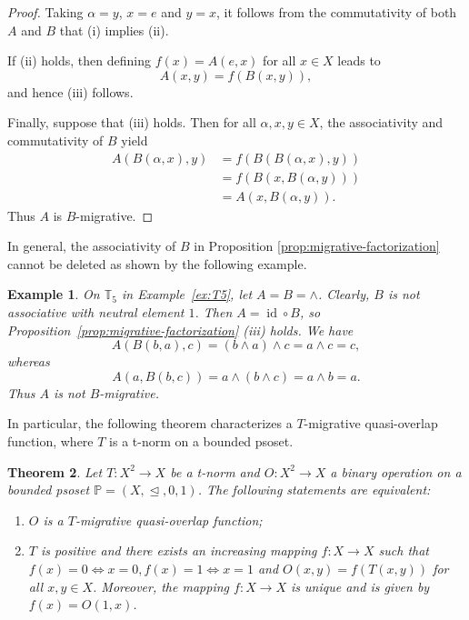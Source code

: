 \documentclass[preprint,12pt]{elsarticle}
\newtheorem{theorem}{Theorem}[section]
\newtheorem{example}[theorem]{Example}
\begin{document}
\begin{proof}
Taking $\alpha=y$, $x=e$ and $y=x$, it follows from the commutativity of both $A$ and $B$ that (i) implies (ii).

If (ii) holds, then defining $f(x)=A(e,x)$ for all $x\in X$ leads to
$$
 A(x,y)=f(B(x,y)),
$$
and hence (iii) follows.

Finally, suppose that (iii) holds. Then for all $\alpha,x,y\in X$, the associativity and commutativity of $B$ yield
$$
\begin{aligned}
A(B(\alpha,x),y)
&=f(B(B(\alpha,x),y))\\
&=f(B(x,B(\alpha,y)))\\
&=A(x,B(\alpha,y)).
\end{aligned}
$$
Thus $A$ is $B$-migrative.
\end{proof}

In general, the associativity of $B$ in Proposition \ref{prop:migrative-factorization} cannot be deleted as shown by the following example.
\begin{example}\label{ex:migrativity-assoc-essential}
\upshape
On $\mathbb{T}_5$ in Example~\ref{ex:T5}, let $A=B=\wedge$. Clearly, $B$ is not associative with  neutral element $1$. Then $A=\operatorname{id}\circ B$, so Proposition~\ref{prop:migrative-factorization} (iii) holds. We have
$$
 A(B(b,a),c)=(b\wedge a)\wedge c=a\wedge c=c,
$$
whereas
$$
 A(a,B(b,c))=a\wedge(b\wedge c)=a\wedge b=a.
$$
Thus $A$ is not $B$-migrative.
\end{example}

In particular, the following theorem characterizes a $T$-migrative quasi-overlap function, where $T$ is a t-norm on a bounded psoset.
\begin{theorem}\label{thm:tnorm-migrative}
Let $T:X^2\to X$ be a t-norm and $O:X^2\to X$ a binary operation on a bounded psoset $\mathbb{P}=(X,\trianglelefteq,0,1)$. The following statements are equivalent:
\begin{enumerate}[label=(\roman*)]
\item $O$ is a $T$-migrative quasi-overlap function;
\item $T$ is positive and there exists an increasing mapping $f:X\to X$ such that
$f(x)=0\Longleftrightarrow x=0,
f(x)=1\Longleftrightarrow x=1$
and
$O(x,y)=f(T(x,y))$ for all $x,y\in X$.
Moreover, the  mapping $f:X\to X$ is unique and is given by $f(x)=O(1,x)$.
\end{enumerate}
\end{theorem}
\end{document}
